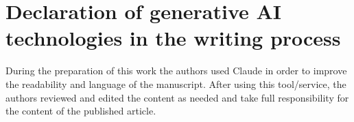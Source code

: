 \documentclass[a4paper,fleqn]{cas-dc}
\begin{document}
    \section*{Declaration of generative AI technologies in the writing process}
\hspace*{1.2em} During the preparation of this work the authors used Claude in order to improve the readability and language of the manuscript. After using this tool/service, the authors reviewed and edited the content as needed and take full responsibility for the content of the published article.

    
    \printcredits
    
    
    
    
\end{document}
